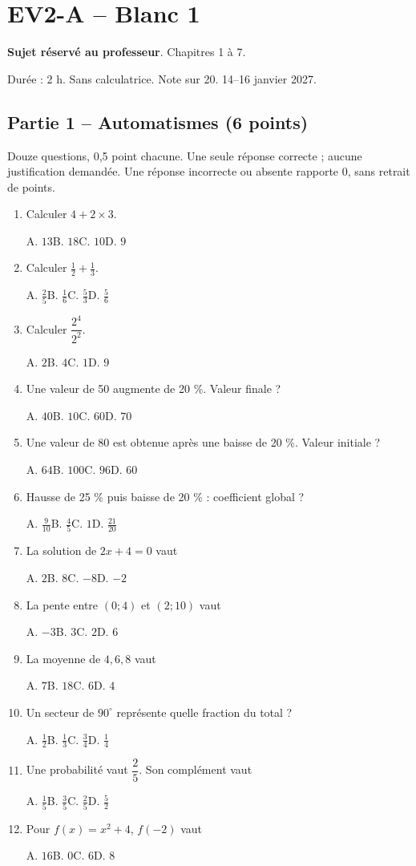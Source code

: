 \clearpage\section*{EV2-A -- Blanc 1}\label{EV2-A}
\textbf{Sujet réservé au professeur}. Chapitres 1 à 7.\par Durée : 2 h. Sans calculatrice. Note sur 20. 14–16 janvier 2027.
\subsection*{Partie 1 -- Automatismes (6 points)}
Douze questions, 0,5 point chacune. Une seule réponse correcte ; aucune justification demandée. Une réponse incorrecte ou absente rapporte 0, sans retrait de points.
\begin{enumerate}
\item Calculer $4+2\times3$.\par A. $13$\quad B. $18$\quad C. $10$\quad D. $9$
\item Calculer $\frac12+\frac13$.\par A. $\frac{2}{5}$\quad B. $\frac{1}{6}$\quad C. $\frac{5}{3}$\quad D. $\frac{5}{6}$
\item Calculer $\dfrac{2^4}{2^{2}}$.\par A. $2$\quad B. $4$\quad C. $1$\quad D. $9$
\item Une valeur de 50 augmente de 20 \%. Valeur finale ?\par A. $40$\quad B. $10$\quad C. $60$\quad D. $70$
\item Une valeur de 80 est obtenue après une baisse de 20 \%. Valeur initiale ?\par A. $64$\quad B. $100$\quad C. $96$\quad D. $60$
\item Hausse de 25 \% puis baisse de 20 \% : coefficient global ?\par A. $\frac{9}{10}$\quad B. $\frac{4}{5}$\quad C. $1$\quad D. $\frac{21}{20}$
\item La solution de $2x+4=0$ vaut\par A. $2$\quad B. $8$\quad C. $-8$\quad D. $-2$
\item La pente entre $(0;4)$ et $(2;10)$ vaut\par A. $-3$\quad B. $3$\quad C. $2$\quad D. $6$
\item La moyenne de $4, 6, 8$ vaut\par A. $7$\quad B. $18$\quad C. $6$\quad D. $4$
\item Un secteur de $90^\circ$ représente quelle fraction du total ?\par A. $\frac{1}{2}$\quad B. $\frac{1}{3}$\quad C. $\frac{3}{4}$\quad D. $\frac{1}{4}$
\item Une probabilité vaut $\dfrac{2}{5}$. Son complément vaut\par A. $\frac{1}{5}$\quad B. $\frac{3}{5}$\quad C. $\frac{2}{5}$\quad D. $\frac{5}{2}$
\item Pour $f(x)=x^2+4$, $f(-2)$ vaut\par A. $16$\quad B. $0$\quad C. $6$\quad D. $8$
\end{enumerate}
